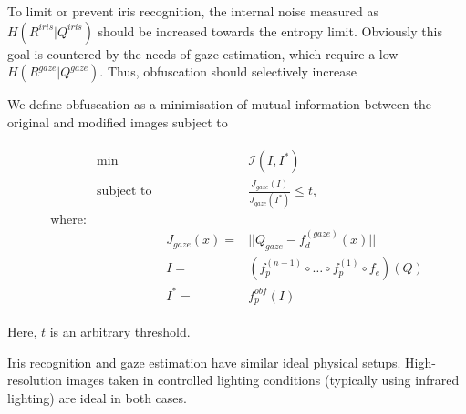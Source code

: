 To limit or prevent iris recognition, the internal noise measured as $H(R^{iris}|Q^{iris})$ should be increased towards the entropy limit. Obviously this goal is countered by the needs of gaze estimation, which require a low $H(R^{gaze}|Q^{gaze})$. Thus, obfuscation should selectively increase 

We define obfuscation as a minimisation of mutual information between the original and modified images subject to

\begin{align}
\begin{aligned}
    &\min & & \mathcal{I}(I, I^*)\\
    &\text{subject to } & &  \frac{J_{gaze}(I)}{J_{gaze}(I^*)} \leq t,\\
    \text{where:}&\\
    &&J_{gaze}(x) =& ||Q_{gaze}- f_d^{(gaze)}(x)||\\
    &&I =& \left( f_p^{(n-1)} \circ \dots \circ f_p^{(1)} \circ f_e\right) (Q)\\
    &&I^* =& f_p^{obf}(I)
\end{aligned}
\end{align}

Here, $t$ is an arbitrary threshold.

Iris recognition and gaze estimation have similar ideal physical setups. High-resolution images taken in controlled lighting conditions (typically using infrared lighting) are ideal in both cases. 





